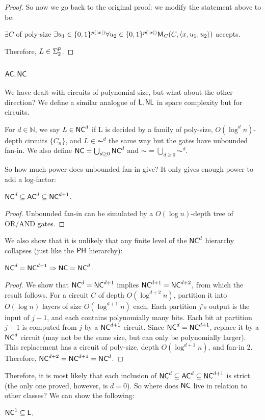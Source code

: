 \begin{proof}
\par So now we go back to the original proof: we modify the statement above to be:
\begin{center}
$\exists C$ of poly-size $\exists u_1 \in \{0, 1\}^{p(|x|)} \forall u_2 \in \{0, 1\}^{p(|x|)} \M_C(C, \langle x, u_1, u_2\rangle)$ accepts.
\end{center}
Therefore, $L \in \Sigma_2^\P$.
\end{proof}

\subsection{$\AC, \NC$}
We have dealt with circuits of polynomial size, but what about the other direction? We define a similar analogue of $\L, \NL$ in space complexity but for circuits.

\begin{definition}
For $d \in \mathbb{N}$, we say $L \in \NC^d$ if L is decided by a family of poly-size, $O(\log^d n)$-depth circuits $\{C_n\}$, and $L \in \AC^d$ the same way but the gates have unbounded fan-in. We also define $\NC = \bigcup_{d \ge 0}\NC^d$ and $\AC = \bigcup_{d \ge 0}\AC^d$.
\end{definition}
So how much power does unbounded fan-in give? It only gives enough power to add a log-factor:

\begin{theorem}
$\NC^d \subseteq \AC^d \subseteq \NC^{d+1}$.
\end{theorem}
\begin{proof}
Unbounded fan-in can be simulated by a $O(\log n)$-depth tree of OR/AND gates.
\end{proof}

We also show that it is unlikely that any finite level of the $\NC^d$ hierarchy collapses (just like the $\PH$ hierarchy):
\begin{theorem}
$\NC^d = \NC^{d+1} \Rightarrow \NC = \NC^d$.
\end{theorem}

\begin{proof}
We show that $\NC^d = \NC^{d+1}$ implies $\NC^{d+1} = \NC^{d+2}$, from which the result follows. For a circuit $C$ of depth $O(\log^{d+2} n)$, partition it into $O(\log n)$ layers of size $O(\log^{d+1} n)$ each. Each partition $j$'s output is the input of $j+1$, and each contains polynomially many bits. Each bit at partition $j+1$ is computed from $j$ by a $\NC^{d+1}$ circuit. Since $\NC^d = \NC^{d+1}$, replace it by a $\NC^d$ circuit (may not be the same size, but can only be polynomially larger). This replacement has a circuit of poly-size, depth $O(\log^{d+1} n)$, and fan-in 2. Therefore, $\NC^{d+2} = \NC^{d+1} = \NC^d$. 
\end{proof}
Therefore, it is most likely that each inclusion of $\NC^d \subseteq \AC^d \subseteq \NC^{d+1}$ is strict (the only one proved, however, is $d = 0$).  So where does $\NC$ live in relation to other classes? We can show the following:
\begin{theorem}
$\NC^1 \subseteq \L$.
\end{theorem}

